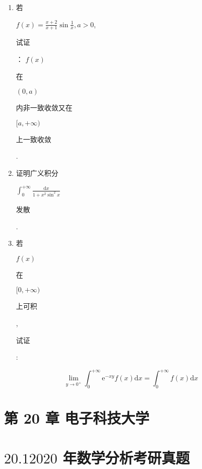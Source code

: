 \documentclass[10pt]{article}
\begin{document}
\begin{enumerate}
  \item \begin{CJK}{UTF8}{mj}若\end{CJK} $f(x)=\frac{x+2}{x+1} \sin \frac{1}{x}, a>0$, \begin{CJK}{UTF8}{mj}试证\end{CJK}： $f(x)$ \begin{CJK}{UTF8}{mj}在\end{CJK} $(0, a)$ \begin{CJK}{UTF8}{mj}内非一致收敛又在\end{CJK} $[a,+\infty)$ \begin{CJK}{UTF8}{mj}上一致收敛\end{CJK}.

  \item \begin{CJK}{UTF8}{mj}证明广义积分\end{CJK} $\int_{0}^{+\infty} \frac{\mathrm{d} x}{1+x^{2} \sin ^{2} x}$ \begin{CJK}{UTF8}{mj}发散\end{CJK}.

  \item \begin{CJK}{UTF8}{mj}若\end{CJK} $f(x)$ \begin{CJK}{UTF8}{mj}在\end{CJK} $[0,+\infty)$ \begin{CJK}{UTF8}{mj}上可积\end{CJK}, \begin{CJK}{UTF8}{mj}试证\end{CJK}:

\end{enumerate}
$$
\lim _{y \rightarrow 0^{+}} \int_{0}^{+\infty} \mathrm{e}^{-x y} f(x) \mathrm{d} x=\int_{0}^{+\infty} f(x) \mathrm{d} x
$$

\section{第 20 章 电子科技大学}
\section{$20.12020$ 年数学分析考研真题}
\end{document}

